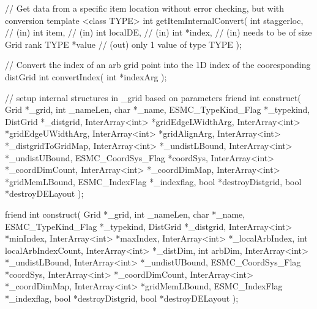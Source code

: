 {{  // Get data from a specific item location without error checking, but with conversion 
  template <class TYPE> int getItemInternalConvert(
                                  int staggerloc, // (in)
                  int item,       // (in)
                                  int localDE,    // (in)
                                  int *index,     // (in)  needs to be of size Grid rank
                                  TYPE *value     // (out) only 1 value of type TYPE
                                  );
 
 
 
  // Convert the index of an arb grid point into the 1D index of the cooresponding distGrid
  int convertIndex(
           int *indexArg
           );
 
  // setup internal structures in _grid based on parameters
  friend int construct(
               Grid *_grid, 
               int _nameLen,
               char *_name, 
               ESMC_TypeKind_Flag *_typekind,
               DistGrid *_distgrid,     
                       InterArray<int> *gridEdgeLWidthArg,
                       InterArray<int> *gridEdgeUWidthArg,
                       InterArray<int> *gridAlignArg,
               InterArray<int> *_distgridToGridMap,   
               InterArray<int> *_undistLBound,  
               InterArray<int> *_undistUBound,
                       ESMC_CoordSys_Flag *coordSys, 
               InterArray<int> *_coordDimCount,
               InterArray<int> *_coordDimMap,
                       InterArray<int> *gridMemLBound,
               ESMC_IndexFlag *_indexflag, 
               bool *destroyDistgrid,
               bool *destroyDELayout
               );
   
  friend int construct(
               Grid *_grid, 
               int _nameLen,
               char *_name, 
               ESMC_TypeKind_Flag *_typekind,
               DistGrid *_distgrid,     
               InterArray<int> *minIndex,   
               InterArray<int> *maxIndex,   
               InterArray<int> *_localArbIndex,
               int localArbIndexCount,            
               InterArray<int> *_distDim, 
               int arbDim,
               InterArray<int> *_undistLBound,  
               InterArray<int> *_undistUBound,
                       ESMC_CoordSys_Flag *coordSys, 
               InterArray<int> *_coordDimCount,
               InterArray<int> *_coordDimMap,
                       InterArray<int> *gridMemLBound,
               ESMC_IndexFlag *_indexflag, 
               bool *destroyDistgrid,
               bool *destroyDELayout
               );
   
}}
